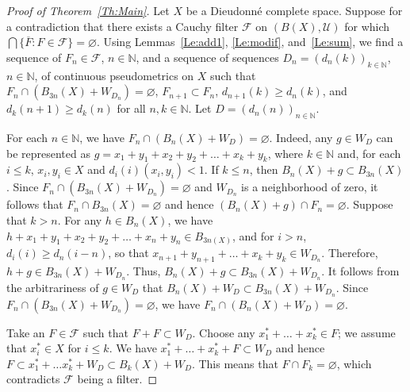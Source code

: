 \documentclass[a4paper,12pt]{amsart}
\def\sub{\subset}
\theoremstyle{definition}
\begin{document}
\begin{proof}[Proof of Theorem~\ref{Th:Main}]
Let $X$ be a Dieudonn\'e complete space. Suppose for a contradiction that there 
exists a Cauchy filter $\mathscr F$ on $(B(X), \mathscr U)$ for which $\bigcap 
\{\overline F: F\in \mathscr F\}=\varnothing$. Using Lemmas~\ref{Le:add1},  
\ref{Le:modif}, and~\ref{Le:sum}, we find a sequence of $F_n\in \mathscr F$, 
$n\in \mathbb N$, and a sequence of sequences $D_n=(d_n(k))_{k\in 
\mathbb N}$, $n\in \mathbb N$, of continuous pseudometrics on $X$ such 
that $F_n\cap (B_{3n}(X)+W_{D_n})=\varnothing$, $F_{n+1}\subset F_n$, 
$d_{n+1}(k)\ge d_{n}(k)$, and $d_k(n+1)\ge d_k(n)$ for 
all $n,k\in \mathbb N$. Let $D=(d_n(n))_{n\in \mathbb N}$. 

For each $n\in \mathbb N$, we have $F_n\cap 
(B_n(X)+W_D)=\varnothing$. Indeed, any $g\in W_D$ can be 
represented as $g=x_1+y_1+x_2+y_2+ \dots +x_k+y_k$, where $k \in \mathbb N$ 
and,  for each $i\le k$, $x_i, y_i\in X$ and $d_i(i)(x_i, y_i)<1$. If $k\le n$, 
then $B_n(X)+g\subset B_{3n}(X)$. Since $F_n\cap 
(B_{3n}(X)+W_{D_n})=\varnothing$ and $W_{D_n}$ is a neighborhood of zero, it 
follows that $F_n\cap B_{3n}(X)=\varnothing$ and hence $(B_n(X)+g)\cap F_n = 
\varnothing$. Suppose that $k>n$. For any $h\in B_n(X)$, we have 
$h+x_1+y_1+x_2+y_2+\dots +x_n+y_n\in B_{3n(X)}$, and for $i>n$, 
$d_i(i)\ge d_n(i-n)$, so that $x_{n+1}+y_{n+1}+\dots +x_k+ y_k\in 
W_{D_n}$. Therefore, $h+g\in B_{3n}(X)+W_{D_n}$. Thus, $B_n(X)+g\sub 
B_{3n}(X)+W_{D_n}$. It follows from the arbitrariness of $g\in W_D$ that  
$B_n(X)+W_D\sub B_{3n}(X)+W_{D_n}$. Since $F_n\cap 
(B_{3n}(X)+W_{D_n})=\varnothing$, we have $F_n\cap 
(B_n(X)+W_D)=\varnothing$. 

Take an $F\in \mathscr F$ such that $F+F\subset W_D$. Choose any $x^*_1+\dots+ 
x^*_k\in F$; we assume that $x^*_i\in X$ for $i\le k$. We have $x^*_1+\dots + 
x^*_k+F\subset W_D$ and hence $F\subset x^*_1+\dots x^*_k+W_D\subset 
B_k(X)+W_D$. This means that $F\cap F_k=\varnothing$, which contradicts 
$\mathscr F$ being a filter. 
\end{proof}
\end{document}
